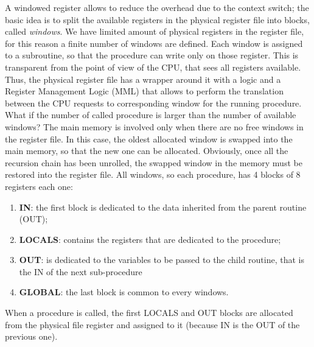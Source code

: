 A windowed register allows to reduce the overhead due to the context switch; the basic idea
is to split the available registers in the physical register file into blocks, called \textit{windows}. We have limited amount of physical registers in the register file, for this reason a finite number of windows are defined. Each window is assigned to a subroutine, so that the procedure can write only on those register. This is transparent from the point of view of the CPU, that sees all registers available. Thus, the physical register file has a wrapper around it with a logic and a Register Management Logic (MML) that allows to perform the translation between the CPU requests to corresponding window for the running procedure.\newline\newline
What if the number of called procedure is larger than the number of available windows? The main
memory is involved only when there are no free windows in the register file. In this case, the oldest allocated window is swapped into the main memory, so that the new one can be allocated. Obviously, once all the recursion chain has been unrolled, the swapped window in the memory must be restored into the register file.
All windows, so each procedure, has 4 blocks of 8 registers each one:
\begin{enumerate}
	\itemsep0sp
	\item \textbf{IN}: the first block is dedicated to the data inherited from the parent routine (OUT);
	\item \textbf{LOCALS}: contains the registers that are dedicated to the procedure;
	\item \textbf{OUT}: is dedicated to the variables to be passed to the child routine, that is the IN of the next sub-procedure
	\item \textbf{GLOBAL}: the last block is common to every windows.
\end{enumerate}
When a procedure is called, the first LOCALS and OUT blocks are allocated from the physical file register and assigned to it (because IN is the OUT of the previous one).

